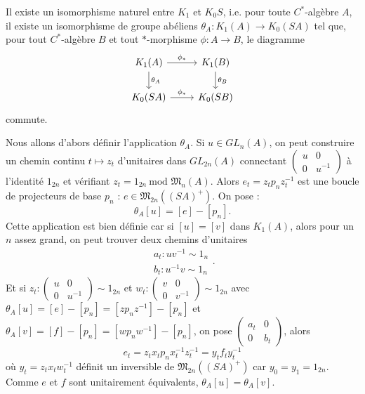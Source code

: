 \begin{thm}
Il existe un isomorphisme naturel  entre $K_1$ et $K_0 S$, i.e. pour toute $C^*$-algèbre $A$, il existe un isomorphisme de groupe abéliens $\theta_A : K_1(A) \rightarrow K_0(SA)$ tel que, pour tout $C^*$-algèbre $B$ et tout $*$-morphisme $\phi : A\rightarrow B$, le diagramme 
\[\begin{tikzcd}K_1(A) \arrow{r}{\phi_*}\arrow{d}{\theta_A} & K_1(B) \arrow{d}{\theta_B} \\ K_0(SA)\arrow{r}{\phi_*} & K_0(SB)\end{tikzcd}\]
commute.
\end{thm}

\begin{dem}
Nous allons d'abors définir l'application $\theta_A$. Si $u\in GL_n(A)$, on peut construire un chemin continu $t\mapsto z_t $ d'unitaires dans $GL_{2n}(A)$ connectant $\begin{pmatrix}u & 0 \\ 0 & u^{-1}\end{pmatrix}$ à l'identité $1_{2n}$ et vérifiant $z_t = 1_{2n} \ \text{mod } \mathfrak M_n(A)$. Alors $e_t = z_t p_n z_t^{-1}$ est une boucle de projecteurs de base $p_n$ : $e\in \mathfrak M_{2n}((SA)^+)$. On pose :
\[\theta_A [u] = [e]-[p_n].\]
Cette application est bien définie car si $[u]=[v]$ dans $ K_1(A)$, alors pour un $n$ assez grand, on peut trouver deux chemins d'unitaires
\[\begin{array}{c} a_t : uv^{-1} \sim 1_n \\ b_t : u^{-1}v \sim 1_n\end{array}.\]
Et si $z_t : \begin{pmatrix}u & 0 \\ 0 & u^{-1}\end{pmatrix} \sim 1_{2n} $ et $w_t : \begin{pmatrix}v & 0 \\ 0 & v^{-1}\end{pmatrix} \sim 1_{2n} $ avec $\theta_A [u]= [e]-[p_n]=[zp_n z^{-1}]-[p_n]$ et $\theta_A [v]= [f]-[p_n]=[wp_n w^{-1}]-[p_n]$, on pose $\begin{pmatrix}a_t & 0 \\ 0 & b_t \end{pmatrix}$, alors 
\[e_t = z_t x_t p_n x_t^{-1} z_t^{-1} = y_t f_t y_t^{-1}\] 
où $y_t = z_t x_t w_t^{-1}$ définit un inversible de $\mathfrak M_{2n}((SA)^+)$ car $y_0=y_1=1_{2n}$. Comme $e$ et $f$ sont unitairement équivalents, $\theta_A [u]=\theta_A [v]$.\\


\end{dem}
